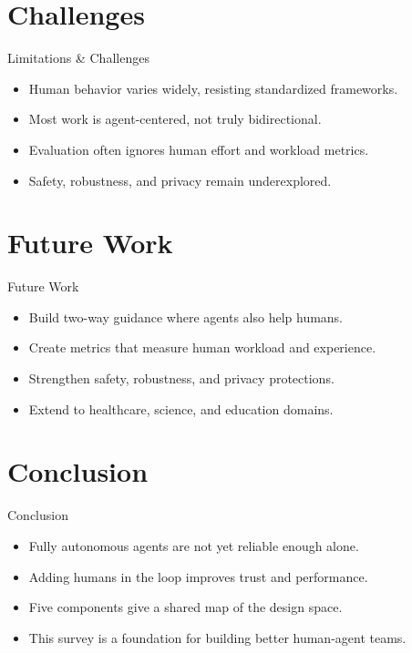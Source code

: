 \documentclass[10pt]{beamer}
\begin{document}
\section{Challenges}
\begin{frame}{Limitations \& Challenges}
\begin{itemize}
  \item Human behavior varies widely, resisting standardized frameworks.
  \item Most work is agent-centered, not truly bidirectional.
  \item Evaluation often ignores human effort and workload metrics.
  \item Safety, robustness, and privacy remain underexplored.
\end{itemize}
\end{frame}
\section{Future Work}
\begin{frame}{Future Work}
\begin{itemize}
  \item Build two-way guidance where agents also help humans.
  \item Create metrics that measure human workload and experience.
  \item Strengthen safety, robustness, and privacy protections.
  \item Extend to healthcare, science, and education domains.
\end{itemize}
\end{frame}
\section{Conclusion}
\begin{frame}{Conclusion}
\begin{itemize}
  \item Fully autonomous agents are not yet reliable enough alone.
  \item Adding humans in the loop improves trust and performance.
  \item Five components give a shared map of the design space.
  \item This survey is a foundation for building better human-agent teams.
\end{itemize}
\end{frame}
\end{document}
